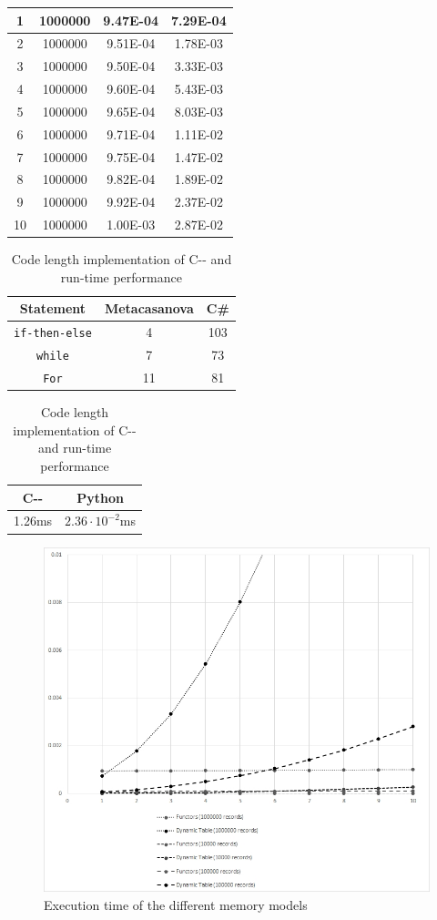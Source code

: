 \begin{table}
\begin{tabular}{|c|c|c|c|}
		1&	1000000&	9.47E-04&	7.29E-04\\ \hline
		2&	1000000&	9.51E-04&	1.78E-03\\ \hline
		3&	1000000&	9.50E-04&	3.33E-03\\ \hline
		4&	1000000&	9.60E-04&	5.43E-03\\ \hline
		5&	1000000&	9.65E-04&	8.03E-03\\ \hline
		6&	1000000&	9.71E-04&	1.11E-02\\ \hline
		7&	1000000&	9.75E-04&	1.47E-02\\ \hline
		8&	1000000&	9.82E-04&	1.89E-02\\ \hline
		9&	1000000&	9.92E-04&	2.37E-02\\ \hline
		10&	1000000&	1.00E-03&	2.87E-02\\ \hline
					
	\end{tabular}
	\label{tab:functors}
\end{table}

\begin{table}
	\centering
	\caption{Code length implementation of C-{}- and run-time performance}
	\begin{tabular}{|c|c|c|}
		\hline
		\textbf{Statement} & \textbf{Metacasanova} & \textbf{C\#}\\
		\hline
		\texttt{if-then-else} & 4 & 103 \\
		\hline
		\texttt{while} & 7 & 73 \\
		\hline
		\texttt{For} & 11 & 81\\
		\hline
	\end{tabular}
	
	\vspace{0.15cm}
	\begin{tabular}{|c|c|}
		\hline
		\textbf{C-{}-} & \textbf{Python} \\
		\hline
		1.26ms & $2.36 \cdot 10^{-2}$ms \\
		\hline
	\end{tabular}
	\label{tab:cmm}
\end{table}

\begin{figure}
	\includegraphics[width = \columnwidth]{Figures/chart.jpg}
	\caption{Execution time of the different memory models}
	\label{fig:chart}
\end{figure}